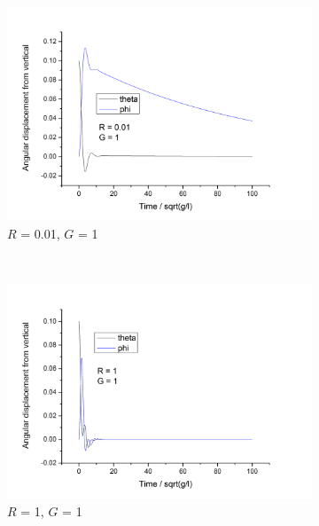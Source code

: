\documentclass[11pt]{article}
\begin{document}
\begin{figure}[h!] \label{fig:dp_motion_G1}
  \centering
  \begin{subfigure}[h]{0.5\textwidth}
    \includegraphics[width=\textwidth]{img/dp/R=0-01_G=1.png}
    \captionsetup{width=0.85\textwidth}
    \caption{$R$ = 0.01, $G$ = 1}
    \label{fig:dp_R0.01_G0}
  \end{subfigure}%
  ~ %
  \begin{subfigure}[h]{0.5\textwidth}
    \includegraphics[width=\textwidth]{img/dp/R=1_G=1.png}
    \captionsetup{width=0.85\textwidth}
    \caption{$R$ = 1, $G$ = 1}
    \label{fig:dp_R1_G0}
  \end{subfigure}
  ~ %
  \begin{subfigure}[h]{0.5\textwidth}

\end{subfigure}
\end{figure}
\end{document}
